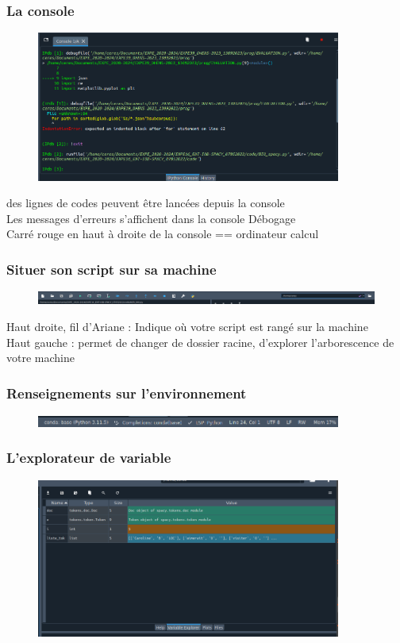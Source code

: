 \begin{frame}  \frametitle{La console}
  \begin{figure}
  \includegraphics[width=10cm]{images/spyder_console.png}
  \end{figure}
   des lignes de codes peuvent être lancées depuis la console\\
   Les messages d'erreurs s'affichent dans la console  Débogage\\
   Carré rouge en haut à droite de la console  == ordinateur calcul
\end{frame}

\begin{frame}
  \frametitle{Situer son script sur sa machine}
  \begin{figure}
  \includegraphics[width=15cm]{images/spyder_chemin.png}
  \end{figure}
   Haut droite, fil d'Ariane : Indique où votre script est rangé sur la machine\\
   Haut gauche : permet de changer de dossier racine, d'explorer l'arborescence de votre machine
\end{frame}

\begin{frame}
  \frametitle{Renseignements sur l'environnement}
  \begin{figure}
  \includegraphics[width=10cm]{images/spyder_infos.png}
  \end{figure}
\end{frame}

\begin{frame}  
\frametitle{L'explorateur de variable}
\begin{figure}
  \includegraphics[width=10cm]{images/spyder_explo_variable.png}
  \end{figure}
\end{frame}

